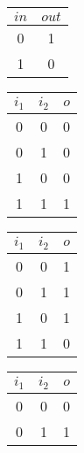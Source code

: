 \documentclass[../../main.tex]{subfiles}
\begin{document}
\begin{table}[H]
	\begin{minipage}[t]{0.166\textwidth}
		\begin{center}
			\begin{tabular}{|c|c|}
				\hline
				$in$ & $out$
				\\ \hline \hline
				0    & 1
				\\ \hline
				1    & 0
				\\ \hline
			\end{tabular}
		\end{center}
	\end{minipage}\hfill
	\begin{minipage}[t]{0.166\textwidth}
		\begin{center}
			\begin{tabular}{|c|c|c|}
				\hline
				$i_1$ & $i_2$ & $o$
				\\ \hline \hline
				0     & 0     & 0
				\\ \hline
				0     & 1     & 0
				\\ \hline
				1     & 0     & 0
				\\ \hline
				1     & 1     & 1
				\\ \hline
			\end{tabular}
		\end{center}
	\end{minipage}\hfill
	\begin{minipage}[t]{0.166\textwidth}
		\begin{center}
			\begin{tabular}{|c|c|c|}
				\hline
				$i_1$ & $i_2$ & $o$
				\\ \hline \hline
				0     & 0     & 1
				\\ \hline
				0     & 1     & 1
				\\ \hline
				1     & 0     & 1
				\\ \hline
				1     & 1     & 0
				\\ \hline
			\end{tabular}
		\end{center}
	\end{minipage}\hfill
	\begin{minipage}[t]{0.166\textwidth}
		\begin{center}
			\begin{tabular}{|c|c|c|}
				\hline
				$i_1$ & $i_2$ & $o$
				\\ \hline \hline
				0     & 0     & 0
				\\ \hline
				0     & 1     & 1

\end{tabular}
\end{center}
\end{minipage}
\end{table}
\end{document}
